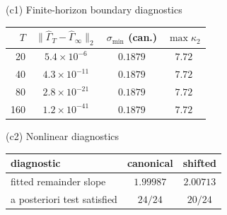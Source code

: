 \documentclass[twocolumn,nameyear,amsthm]{autart}
\numberwithin{equation}{section}
\begin{document}
\begin{table}[t]
\smallskip
\begin{minipage}[t]{.48\textwidth}
\centering
(c1) Finite-horizon boundary diagnostics

\smallskip
\begin{tabular}{@{}rccc@{}}
\toprule
$T$ & $\|\widehat\Gamma_T-\widehat\Gamma_\infty\|_2$
& $\sigma_{\min}$ (can.) & $\max\kappa_2$\\
\midrule
20 & $5.4\times10^{-6}$ & $0.1879$ & $7.72$\\
40 & $4.3\times10^{-11}$ & $0.1879$ & $7.72$\\
80 & $2.8\times10^{-21}$ & $0.1879$ & $7.72$\\
160 & $1.2\times10^{-41}$ & $0.1879$ & $7.72$\\
\bottomrule
\end{tabular}
\end{minipage}
\hfill
\begin{minipage}[t]{.48\textwidth}
\centering
(c2) Nonlinear diagnostics

\smallskip
\begin{tabular}{@{}lcc@{}}
\toprule
diagnostic & canonical & shifted\\
\midrule
fitted remainder slope & $1.99987$ & $2.00713$\\
a posteriori test satisfied & $24/24$ & $20/24$\\
\bottomrule
\end{tabular}
\end{minipage}
\end{table}
\end{document}
